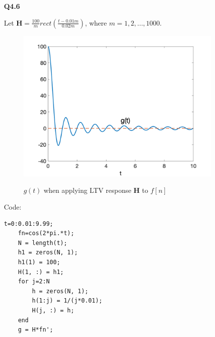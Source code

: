 \documentclass[12pt,a4paper]{article}
\begin{document}
    \newpage
    \Large{\textbf{Q4.6}}
    
    Let $\mathbf{H}=\frac{100}{m}rect(\frac{t-0.01m}{0.02m})$, where $m=1,2,...,1000$. 
    \begin{figure}[!ht]
        \centering
        \includegraphics*[width=0.9\textwidth]{ltv.png}
        \label{fig:3}
        \caption{$g(t)$ when applying LTV response $\mathbf{H}$ to $f[n]$}
    \end{figure}

    Code: \\
    \vspace{-0.5cm}
    \begin{lstlisting}[basicstyle=\large]
    t=0:0.01:9.99;
    fn=cos(2*pi.*t);
    N = length(t);
    h1 = zeros(N, 1);
    h1(1) = 100;
    H(1, :) = h1;
    for j=2:N
        h = zeros(N, 1);
        h(1:j) = 1/(j*0.01);
        H(j, :) = h;
    end
    g = H*fn';
    \end{lstlisting}
\end{document}
